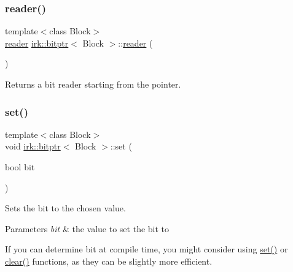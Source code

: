\subsubsection{\texorpdfstring{reader()}{reader()}}
{\footnotesize\ttfamily template$<$class Block$>$ \\
\mbox{\hyperlink{structirk_1_1bitptr_1_1reader}{reader}} \mbox{\hyperlink{classirk_1_1bitptr}{irk\+::bitptr}}$<$ Block $>$\+::\mbox{\hyperlink{structirk_1_1bitptr_1_1reader}{reader}} (\begin{DoxyParamCaption}{ }\end{DoxyParamCaption})\hspace{0.3cm}{\ttfamily [inline]}}



Returns a bit reader starting from the pointer. 

\mbox{\label{classirk_1_1bitptr_ab690150f670134eb879fceb83d892073}} 
\subsubsection{\texorpdfstring{set()}{set()}\hspace{0.1cm}{\footnotesize\ttfamily [1/2]}}
{\footnotesize\ttfamily template$<$class Block$>$ \\
void \mbox{\hyperlink{classirk_1_1bitptr}{irk\+::bitptr}}$<$ Block $>$\+::set (\begin{DoxyParamCaption}\item[{bool}]{bit }\end{DoxyParamCaption})\hspace{0.3cm}{\ttfamily [inline]}}



Sets the bit to the chosen value. 


\begin{DoxyParams}{Parameters}
{\em bit} & the value to set the bit to\\
\hline
\end{DoxyParams}
If you can determine {\ttfamily bit} at compile time, you might consider using {\ttfamily \mbox{\hyperlink{classirk_1_1bitptr_a11089c343ac361d3ca5d86f8109c2d42}{set()}}} or {\ttfamily \mbox{\hyperlink{classirk_1_1bitptr_acb0f89f9751fc114558234b79d49aac6}{clear()}}} functions, as they can be slightly more efficient. \mbox{\label{classirk_1_1bitptr_a11089c343ac361d3ca5d86f8109c2d42}} 
